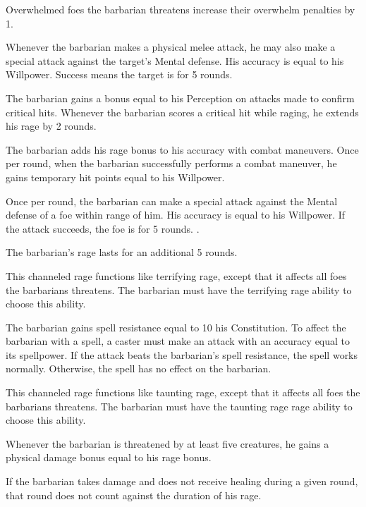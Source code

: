 Overwhelmed foes the barbarian threatens increase their overwhelm penalties by 1.

Whenever the barbarian makes a physical melee attack, he may also make a special attack against the target's Mental defense.
His accuracy is equal to his Willpower.
Success means the target is \shaken for 5 rounds.
\norepeatnotes

The barbarian gains a bonus equal to his Perception on attacks made to confirm critical hits. Whenever the barbarian scores a critical hit while raging, he extends his rage by 2 rounds.

The barbarian adds his rage bonus to his accuracy with combat maneuvers.
Once per round, when the barbarian successfully performs a combat maneuver, he gains temporary hit points equal to his Willpower.

Once per round, the barbarian can make a special attack against the Mental defense of a foe within \rngmed range of him.
His accuracy is equal to his Willpower.
If the attack succeeds, the foe is \taunted for 5 rounds.
\norepeatnotes.

The barbarian's rage lasts for an additional 5 rounds.

This channeled rage functions like terrifying rage, except that it affects all foes the barbarians threatens.
The barbarian must have the terrifying rage ability to choose this ability.

The barbarian gains spell resistance equal to 10 \add his Constitution.
To affect the barbarian with a spell, a caster must make an attack with an accuracy equal to its spellpower.
If the attack beats the barbarian's spell resistance, the spell works normally.
Otherwise, the spell has no effect on the barbarian.

This channeled rage functions like taunting rage, except that it affects all foes the barbarians threatens.
The barbarian must have the taunting rage rage ability to choose this ability.

Whenever the barbarian is threatened by at least five creatures, he gains a physical damage bonus equal to his rage bonus.

If the barbarian takes damage and does not receive healing during a given round, that round does not count against the duration of his rage.

